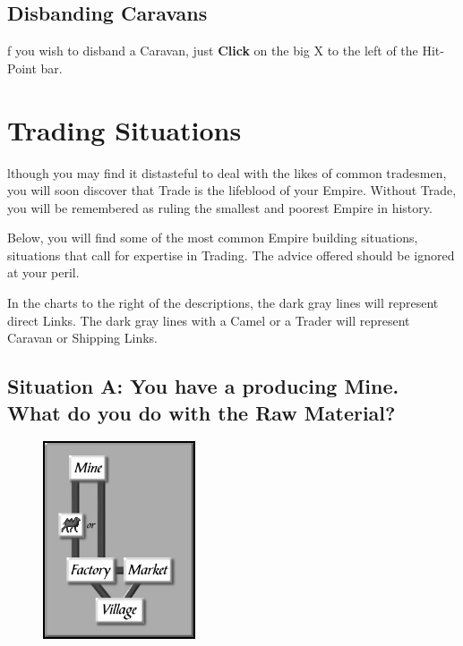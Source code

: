 \subsection{\textsf{Disbanding Caravans}}



f you wish to disband a Caravan, just \textbf{Click} on the big X to the left of the Hit-Point bar.

\section{\textsf{Trading Situations}}


lthough you may find it distasteful to deal with the likes of common tradesmen, you will soon discover that Trade is the lifeblood of your Empire. Without Trade, you will be remembered as ruling the smallest and poorest Empire in history.

Below, you will find some of the most common Empire building situations, situations that call for expertise in Trading. The advice offered should be ignored at your peril.

In the charts to the right of the descriptions, the dark gray lines will represent direct Links. The dark gray lines with a Camel or a Trader will represent Caravan or Shipping Links.


\subsection{\textsf{Situation A: You have a producing Mine. What do you do with the Raw Material?}}

\begin{figure}
    \vspace{-20pt}
    \begin{center}
        \includegraphics[width=0.4\textwidth]{Itradesit1} %
    \end{center}
    \vspace{-20pt}
\end{figure}

